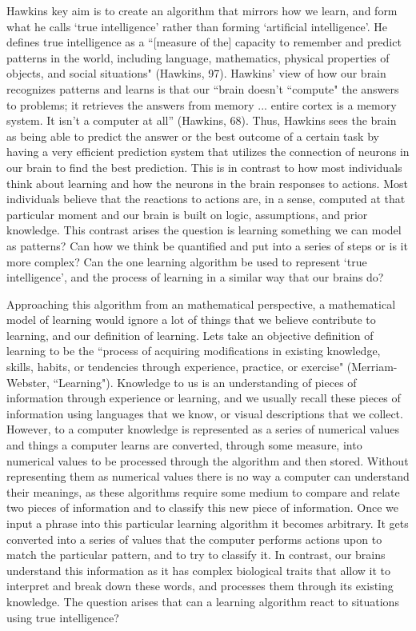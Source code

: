 \documentclass[11pt, oneside]{article}
\begin{document}
\par 
Hawkins key aim is to create an algorithm that mirrors how we learn, and form what he calls `true intelligence' rather than forming `artificial intelligence'. He defines true intelligence as a ``[measure of the] capacity to remember and predict patterns in the world, including language, mathematics, physical properties of objects, and social situations" (Hawkins, 97). 
Hawkins' view of how our brain recognizes patterns and learns is that our ``brain doesn't ``compute" the answers to problems; it retrieves the answers from memory ... entire cortex is a memory system. It isn't a computer at all'' (Hawkins, 68). Thus, Hawkins sees the brain as being able to predict the answer or the best outcome of a certain task by having a very efficient prediction system that utilizes the connection of neurons in our brain to find the best prediction. This is in contrast to how most individuals think about learning and how the neurons in the brain responses to actions. 
Most individuals believe that the reactions to actions are, in a sense, computed at that particular moment and our brain is built on logic, assumptions, and prior knowledge. This contrast arises the question is learning something we can model as patterns? Can how we think be quantified and put into a series of steps or is it more complex? Can the one learning algorithm be used to represent `true intelligence', and the process of learning in a similar way that our brains do?

\par 
Approaching this algorithm from an mathematical perspective, a mathematical model of learning would ignore a lot of things that we believe contribute to learning, and our definition of learning. Lets take an objective definition of learning to be the ``process of acquiring modifications in existing knowledge, skills, habits, or tendencies through experience, practice, or exercise" (Merriam-Webster, ``Learning"). 
Knowledge to us is an understanding of pieces of information through experience or learning, and we usually recall these pieces of information using languages that we know, or visual descriptions that we collect. However, to a computer knowledge is represented as a series of numerical values and things a computer learns are converted, through some measure, into numerical values to be processed through the algorithm and then stored. 
Without representing them as numerical values there is no way a computer can understand their meanings, as these algorithms require some medium to compare and relate two pieces of information and to classify this new piece of information. 
Once we input a phrase into this particular learning algorithm it becomes arbitrary. It gets converted into a series of values that the computer performs actions upon to match the particular pattern, and to try to classify it. 
In contrast, our brains understand this information as it has complex biological traits that allow it to interpret and break down these words, and processes them through its existing knowledge. The question arises that can a learning algorithm react to situations using true intelligence? 
\end{document}

